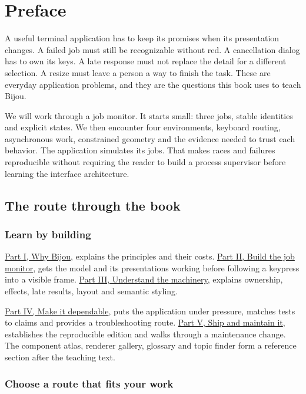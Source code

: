 \chapter*{Preface}\label{preface}

A useful terminal application has to keep its promises when its presentation changes. A failed job must still be recognizable without red. A cancellation dialog has to own its keys. A late response must not replace the detail for a different selection. A resize must leave a person a way to finish the task. These are everyday application problems, and they are the questions this book uses to teach Bijou.

We will work through a job monitor. It starts small: three jobs, stable identities and explicit states. We then encounter four environments, keyboard routing, asynchronous work, constrained geometry and the evidence needed to trust each behavior. The application simulates its jobs. That makes races and failures reproducible without requiring the reader to build a process supervisor before learning the interface architecture.

\section*{The route through the book}
\subsection*{Learn by building}

\hyperref[part-why]{Part I, Why Bijou}, explains the principles and their costs. \hyperref[part-workshops]{Part II, Build the job monitor}, gets the model and its presentations working before following a keypress into a visible frame. \hyperref[part-machinery]{Part III, Understand the machinery}, explains ownership, effects, late results, layout and semantic styling.

\hyperref[part-dependable]{Part IV, Make it dependable}, puts the application under pressure, matches tests to claims and provides a troubleshooting route. \hyperref[part-maintain]{Part V, Ship and maintain it}, establishes the reproducible edition and walks through a maintenance change. The component atlas, renderer gallery, glossary and topic finder form a reference section after the teaching text.

\subsection*{Choose a route that fits your work}

